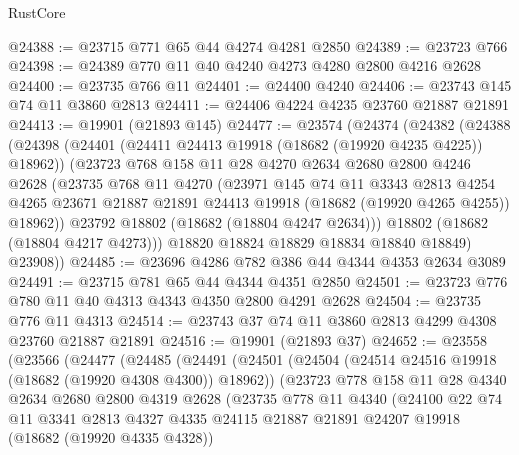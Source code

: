 \begin{lexlean}{RustCore}
\begin{coremodule}
@24388 := @23715 @771 @65 @44 @4274 @4281 @2850
@24389 := @23723 @766
@24398 := @24389 @770 @11 @40 @4240 @4273 @4280 @2800 @4216 @2628
@24400 := @23735 @766 @11
@24401 := @24400 @4240
@24406 := @23743 @145 @74 @11 @3860 @2813
@24411 := @24406 @4224 @4235 @23760 @21887 @21891
@24413 := @19901 (@21893 @145)
@24477 := @23574
    (@24374
      (@24382
        (@24388
          (@24398
            (@24401 (@24411 @24413 @19918 (@18682 (@19920 @4235 @4225)) @18962))
            (@23723
              @768
              @158
              @11
              @28
              @4270
              @2634
              @2680
              @2800
              @4246
              @2628
              (@23735
                @768
                @11
                @4270
                (@23971
                  @145
                  @74
                  @11
                  @3343
                  @2813
                  @4254
                  @4265
                  @23671
                  @21887
                  @21891
                  @24413
                  @19918
                  (@18682 (@19920 @4265 @4255))
                  @18962))
              @23792
              @18802
              (@18682 (@18804 @4247 @2634)))
            @18802
            (@18682 (@18804 @4217 @4273)))
          @18820
          @18824
          @18829
          @18834
          @18840
          @18849)
        @23908))
@24485 := @23696 @4286 @782 @386 @44 @4344 @4353 @2634 @3089
@24491 := @23715 @781 @65 @44 @4344 @4351 @2850
@24501 := @23723 @776 @780 @11 @40 @4313 @4343 @4350 @2800 @4291 @2628
@24504 := @23735 @776 @11 @4313
@24514 := @23743 @37 @74 @11 @3860 @2813 @4299 @4308 @23760 @21887 @21891
@24516 := @19901 (@21893 @37)
@24652 := @23558
    (@23566
      (@24477
        (@24485
          (@24491
            (@24501
              (@24504 (@24514 @24516 @19918 (@18682 (@19920 @4308 @4300)) @18962))
              (@23723
                @778
                @158
                @11
                @28
                @4340
                @2634
                @2680
                @2800
                @4319
                @2628
                (@23735
                  @778
                  @11
                  @4340
                  (@24100
                    @22
                    @74
                    @11
                    @3341
                    @2813
                    @4327
                    @4335
                    @24115
                    @21887
                    @21891
                    @24207
                    @19918
                    (@18682 (@19920 @4335 @4328))

\end{coremodule}
\end{lexlean}
